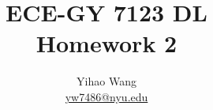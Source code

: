 \documentclass[en, 12pt, a4paper]{0elegantpaper}
\author{Yihao Wang \\ \href{mailto:yw7486@nyu.edu}{yw7486@nyu.edu}} %
\newcommand{\HWIndex}{2}
\begin{document}
\title{ECE-GY 7123 DL\\ Homework \HWIndex}
\maketitle


\end{document}
